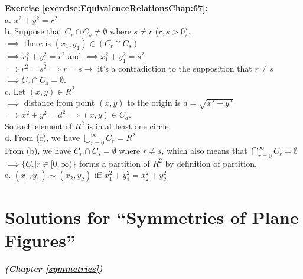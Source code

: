 \textbf{Exercise \ref{exercise:EquivalenceRelationsChap:67}:}\\
a. $x^2+y^2=r^2$\\
b. Suppose that $C_r\cap C_s \neq \emptyset$ where $s\neq r$ ($r,s>0$).\\
$\implies$  there is $(x_1,y_1)\in (C_r\cap C_s)$\\
$\implies x_1^2+y_1^2=r^2$ and $\implies x_1^2+y_1^2=s^2$\\
$\implies r^2=s^2 \implies r=s \to$ it's a contradiction to the supposition that $r\neq s$\\
$\implies C_r\cap C_s=\emptyset$.\\
c. Let $(x,y)\in R^2$\\
$\implies$  distance from point $(x,y)$ to the origin is $d=\sqrt{x^2+y^2}$\\
$\implies x^2+y^2=d^2 \implies (x,y)\in C_d$.\\
So each element of $R^2$ is in at least one circle.\\
d. From (c), we have $\bigcup_{r=0}^{\infty}C_r=R^2$\\
From (b), we have $C_r\cap C_s=\emptyset$ where $r\neq s$, which also means that $\bigcap_{r=0}^{\infty}C_r=\emptyset$\\
$\implies \{C_r|r\in [0,\infty)\}$ forms a partition of $R^2$ by definition of partition.\\
e. $(x_1,y_1)\sim (x_2,y_2)$ iff $x_1^2+y_1^2=x_2^2+y_2^2$\\


\section{Solutions for  ``Symmetries of Plane Figures''}
\noindent\textbf{\textit{ (Chapter \ref{symmetries})}}\bigskip

